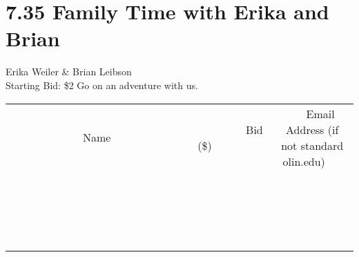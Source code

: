 \documentclass[11pt]{article}
\begin{document}
\section*{7.35 Family Time with Erika and Brian}
Erika Weiler \& Brian Leibson
\\
Starting Bid: \$2
\newline
Go on an adventure with us.
\\[3ex]
\begin{tabular}{c c c}
~~~~~~~~~~~~~Name~~~~~~~~~~~~~ & ~~~~~~~~~Bid (\$)~~~~~~~~~  & ~~~Email Address (if not standard olin.edu)~~~\\
 & & \\
\hline
 & & \\
\hline
 & & \\
\hline
 & & \\
\hline
 & & \\
\hline
 & & \\
\hline
 & & \\
\hline
 & & \\
\hline
 & & \\
\hline
 & & \\
\hline
 & & \\
\hline
 & & \\
\hline
 & & \\
\hline
 & & \\
\hline
 & & \\
\hline
 & & \\
\hline
 & & \\
\hline
 & & \\
\hline
 & & \\
\hline
\end{tabular}
\newpage
\end{document}
